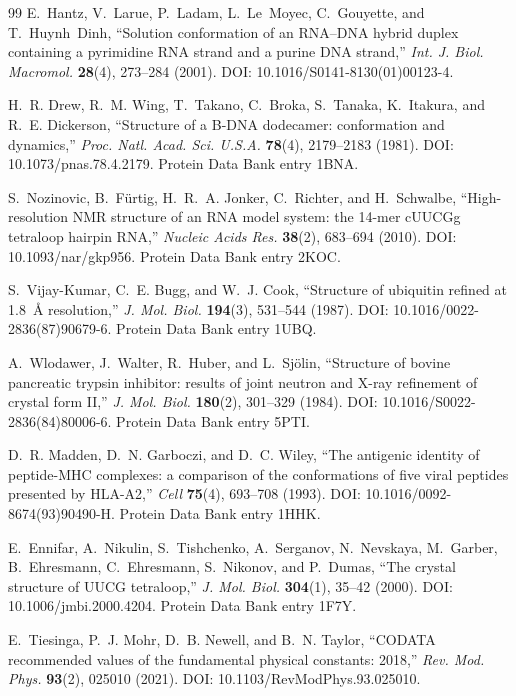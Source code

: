 \begin{thebibliography}{99}
E.~Hantz, V.~Larue, P.~Ladam, L.~Le~Moyec, C.~Gouyette, and T.~Huynh~Dinh,
``Solution conformation of an RNA--DNA hybrid duplex containing a pyrimidine
RNA strand and a purine DNA strand,''
\emph{Int. J. Biol. Macromol.} \textbf{28}(4), 273--284 (2001).
DOI: 10.1016/S0141-8130(01)00123-4.

H.~R. Drew, R.~M. Wing, T.~Takano, C.~Broka, S.~Tanaka, K.~Itakura, and
R.~E. Dickerson,
``Structure of a B-DNA dodecamer: conformation and dynamics,''
\emph{Proc. Natl. Acad. Sci. U.S.A.} \textbf{78}(4), 2179--2183 (1981).
DOI: 10.1073/pnas.78.4.2179. Protein Data Bank entry 1BNA.

S.~Nozinovic, B.~F\"urtig, H.~R.~A. Jonker, C.~Richter, and H.~Schwalbe,
``High-resolution NMR structure of an RNA model system: the 14-mer cUUCGg
tetraloop hairpin RNA,''
\emph{Nucleic Acids Res.} \textbf{38}(2), 683--694 (2010).
DOI: 10.1093/nar/gkp956. Protein Data Bank entry 2KOC.

S.~Vijay-Kumar, C.~E. Bugg, and W.~J. Cook,
``Structure of ubiquitin refined at 1.8~\AA{} resolution,''
\emph{J. Mol. Biol.} \textbf{194}(3), 531--544 (1987).
DOI: 10.1016/0022-2836(87)90679-6. Protein Data Bank entry 1UBQ.

A.~Wlodawer, J.~Walter, R.~Huber, and L.~Sj\"olin,
``Structure of bovine pancreatic trypsin inhibitor: results of joint neutron
and X-ray refinement of crystal form II,''
\emph{J. Mol. Biol.} \textbf{180}(2), 301--329 (1984).
DOI: 10.1016/S0022-2836(84)80006-6. Protein Data Bank entry 5PTI.

D.~R. Madden, D.~N. Garboczi, and D.~C. Wiley,
``The antigenic identity of peptide-MHC complexes: a comparison of the
conformations of five viral peptides presented by HLA-A2,''
\emph{Cell} \textbf{75}(4), 693--708 (1993).
DOI: 10.1016/0092-8674(93)90490-H. Protein Data Bank entry 1HHK.

E.~Ennifar, A.~Nikulin, S.~Tishchenko, A.~Serganov, N.~Nevskaya, M.~Garber,
B.~Ehresmann, C.~Ehresmann, S.~Nikonov, and P.~Dumas,
``The crystal structure of UUCG tetraloop,''
\emph{J. Mol. Biol.} \textbf{304}(1), 35--42 (2000).
DOI: 10.1006/jmbi.2000.4204. Protein Data Bank entry 1F7Y.

E.~Tiesinga, P.~J. Mohr, D.~B. Newell, and B.~N. Taylor,
``CODATA recommended values of the fundamental physical constants: 2018,''
\emph{Rev. Mod. Phys.} \textbf{93}(2), 025010 (2021).
DOI: 10.1103/RevModPhys.93.025010.


\end{thebibliography}
